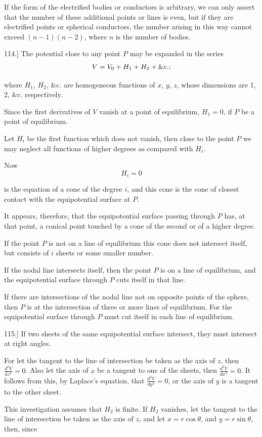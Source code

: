 \documentclass[11pt,a4paper]{article}
\begin{document}
If the form of the electrified bodies or conductors is arbitrary, we can only assert that the number of these additional points or lines is even, but if they are electrified points or spherical conductors, the number arising in this way cannot exceed $(n-1)(n-2)$, where $n$ is the number of bodies.

114.] The potential close to any point $P$ may be expanded in the series
\[
V=V_0+H_1+H_2+\hbox{\&c.};
\]

where $H_1$, $H_2$, \&c. are homogeneous functions of $x$, $y$, $z$, whose dimensions are 1, 2, \&c. respectively.

Since the first derivatives of $V$ vanish at a point of equilibrium, $H_1=0$, if $P$ be a point of equilibrium.

Let $H_i$ be the first function which does not vanish, then close to the point $P$ we may neglect all functions of higher degrees as compared with $H_i$.

Now
\[
H_i=0
\]

is the equation of a cone of the degree $i$, and this cone is the cone of closest contact with the equipotential surface at $P$.

It appears, therefore, that the equipotential surface passing through $P$ has, at that point, a conical point touched by a cone of the second or of a higher degree.

If the point $P$ is not on a line of equilibrium this cone does not intersect itself, but consists of $i$ sheets or some smaller number.

If the nodal line intersects itself, then the point $P$ is on a line of equilibrium, and the equipotential surface through $P$ cuts itself in that line.

If there are intersections of the nodal line not on opposite points of the sphere, then $P$ is at the intersection of three or more lines of equilibrium. For the equipotential surface through $P$ must cut itself in each line of equilibrium.

115.] If two sheets of the same equipotential surface intersect, they must intersect at right angles.

For let the tangent to the line of intersection be taken as the axis of $z$, then $\frac{d^2V}{dz^2}=0$. Also let the axis of $x$ be a tangent to one of the sheets, then $\frac{d^2V}{dx^2}=0$. It follows from this, by Laplace's equation, that $\frac{d^2V}{dy^2}=0$, or the axis of $y$ is a tangent to the other sheet.

This investigation assumes that $H_2$ is finite. If $H_2$ vanishes, let the tangent to the line of intersection be taken as the axis of $z$, and let $x=r\cos\theta$, and $y=r\sin\theta$, then, since
\end{document}
